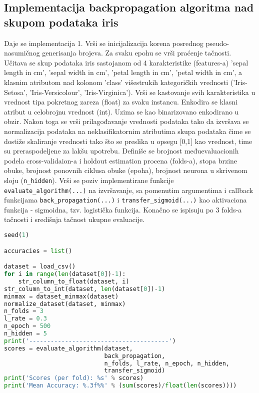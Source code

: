 \documentclass[fontsize=11bp, paper=a4]{scrarticle}
\begin{document}
\subsection*{Implementacija backpropagation algoritma nad skupom podataka iris\cite{bnn}\cite{bnnimpl}}
Daje se implementacija 1. Vrši se inicijalizacija korena posrednog pseudo-nasumičnog generisanja brojeva. Za svaku epohu se vrši praćenje tačnosti. 
Učitava se skup podataka iris\cite{iris} sastojanom od 4 karakteristike (features-a) 'sepal length in cm', 'sepal  width in cm', 'petal length in cm', 'petal width in cm', a klasnim atributom nad kolonom 'class' višestrukih kategoričkih vrednosti ('Iris-Setosa', 'Iris-Versicolour', 'Iris-Virginica'). 
Vrši se kastovanje svih karakteristika u vrednost tipa pokretnog zareza (float) za svaku instancu. 
Enkodira se klasni atribut u celobrojnu vrednost (int). Uzima se kao binarizovano enkodirano u obzir.
Nakon toga se vrši prilagođavanje vrednosti podataka tako da izvršava se normalizacija podataka na neklasifikatornim atributima skupa podataka čime se dostiže skaliranje vrednosti tako što se preslika u opsegu [0,1] kao vrednost, time su preraspodeljene za lakšu upotrebu. Definiše se brojnost međuevaluacionih podela cross-validaion-a i holdout estimation procena (folds-a), stopa brzine obuke, brojnost ponovnih ciklusa obuke (epoha), brojnost neurona u skrivenom sloju 
({\verb* |n_hidden|}).
Vrši se poziv implementirane funkcije \verb*|evaluate_algorithm(...)| na izvršavanje, sa pomenutim argumentima i callback funkcijama \verb|back_propagation(...)| i \verb|transfer_sigmoid(...)| kao aktivaciona funkcija - sigmoidna, tzv. logistička funkcija. Konačno se ispisuju po 3 folds-a tačnosti i središnja tačnost ukupne evaluacije.

\begin{lstlisting}[language=Python, caption=Površni pregled programa]
seed(1)

accuracies = list()

dataset = load_csv()
for i in range(len(dataset[0])-1):
 	str_column_to_float(dataset, i)
str_column_to_int(dataset, len(dataset[0])-1)
minmax = dataset_minmax(dataset)
normalize_dataset(dataset, minmax)
n_folds = 3
l_rate = 0.3
n_epoch = 500
n_hidden = 5
print('---------------------------------------')
scores = evaluate_algorithm(dataset, 
                            back_propagation, 
                            n_folds, l_rate, n_epoch, n_hidden, 
                            transfer_sigmoid)
print('Scores (per fold): %s' % scores)
print('Mean Accuracy: %.3f%%' % (sum(scores)/float(len(scores))))
\end{lstlisting}
\end{document}
